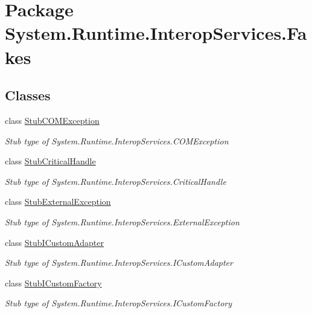 \hypertarget{namespace_system_1_1_runtime_1_1_interop_services_1_1_fakes}{\section{Package System.\-Runtime.\-Interop\-Services.\-Fakes}
\label{namespace_system_1_1_runtime_1_1_interop_services_1_1_fakes}
}
\subsection*{Classes}
\begin{DoxyCompactItemize}
\item 
class \hyperlink{class_system_1_1_runtime_1_1_interop_services_1_1_fakes_1_1_stub_c_o_m_exception}{Stub\-C\-O\-M\-Exception}
\begin{DoxyCompactList}\small\item\em Stub type of System.\-Runtime.\-Interop\-Services.\-C\-O\-M\-Exception\end{DoxyCompactList}\item 
class \hyperlink{class_system_1_1_runtime_1_1_interop_services_1_1_fakes_1_1_stub_critical_handle}{Stub\-Critical\-Handle}
\begin{DoxyCompactList}\small\item\em Stub type of System.\-Runtime.\-Interop\-Services.\-Critical\-Handle\end{DoxyCompactList}\item 
class \hyperlink{class_system_1_1_runtime_1_1_interop_services_1_1_fakes_1_1_stub_external_exception}{Stub\-External\-Exception}
\begin{DoxyCompactList}\small\item\em Stub type of System.\-Runtime.\-Interop\-Services.\-External\-Exception\end{DoxyCompactList}\item 
class \hyperlink{class_system_1_1_runtime_1_1_interop_services_1_1_fakes_1_1_stub_i_custom_adapter}{Stub\-I\-Custom\-Adapter}
\begin{DoxyCompactList}\small\item\em Stub type of System.\-Runtime.\-Interop\-Services.\-I\-Custom\-Adapter\end{DoxyCompactList}\item 
class \hyperlink{class_system_1_1_runtime_1_1_interop_services_1_1_fakes_1_1_stub_i_custom_factory}{Stub\-I\-Custom\-Factory}
\begin{DoxyCompactList}\small\item\em Stub type of System.\-Runtime.\-Interop\-Services.\-I\-Custom\-Factory\end{DoxyCompactList}\item 

\end{DoxyCompactItemize}
